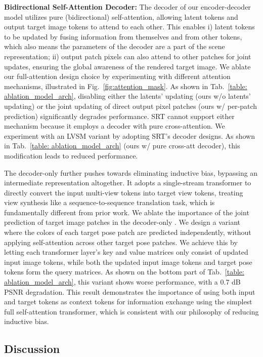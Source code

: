 \textbf{Bidirectional Self-Attention Decoder:}  The decoder of our encoder-decoder model utilizes pure (bidirectional) self-attention, allowing latent tokens and output target image tokens to attend to each other. This enables i) latent tokens to be updated by fusing information from themselves and from other tokens, which also means the parameters of the decoder are a part of the scene representation; ii) output patch pixels can also attend to other patches for joint updates, ensuring the global awareness of the rendered target image. We ablate our full-attention design choice by experimenting with different attention mechanisms, illustrated in Fig.~\ref{fig:attention_mask}. As shown in Tab.~\ref{table: ablation_model_arch}, disabling either the latents' updating (ours w/o latents' updating) or the joint updating of direct output pixel patches (ours w/ per-patch prediction) significantly degrades performance. SRT cannot support either mechanism because it employs a decoder with pure cross-attention.
We experiment with an LVSM variant by adopting SRT's decoder designs. As shown in Tab.~\ref{table: ablation_model_arch} (ours w/ pure cross-att decoder), this modification leads to reduced performance. 


The decoder-only \paperName{} further pushes towards eliminating inductive bias, bypassing an intermediate representation altogether. 
It adopts a single-stream transformer to directly convert the input multi-view tokens into target view tokens, treating view synthesis like a sequence-to-sequence translation task, which is fundamentally different from prior work. 
We ablate the importance of the joint prediction of target image patches in the decoder-only \paperName{}. We design a variant where the colors of each target pose patch are predicted independently, without applying self-attention across other target pose patches. We achieve this by letting each transformer layer's key and value matrices only consist of updated input image tokens, while both the updated input image tokens and target pose tokens form the query matrices. 
As shown on the bottom part of Tab.~\ref{table: ablation_model_arch}, this variant shows worse performance, with a 0.7 dB PSNR degradation. This result demonstrates the importance of using both input and target tokens as context tokens for information exchange using the simplest full self-attention transformer, which is consistent with our philosophy of reducing inductive bias.


\subsection{Discussion}


